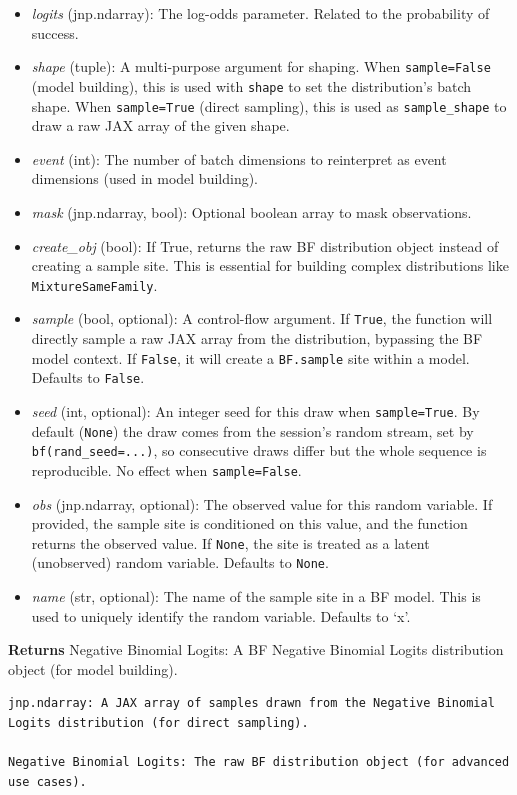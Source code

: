 \documentclass[
  letterpaper,
  DIV=11,
  numbers=noendperiod]{scrartcl}
\begin{document}
\begin{itemize}
\item
  \emph{logits} (jnp.ndarray): The log-odds parameter. Related to the
  probability of success.
\item
  \emph{shape} (tuple): A multi-purpose argument for shaping. When
  \texttt{sample=False} (model building), this is used with
  \texttt{shape} to set the distribution's batch shape. When
  \texttt{sample=True} (direct sampling), this is used as
  \texttt{sample\_shape} to draw a raw JAX array of the given shape.
\item
  \emph{event} (int): The number of batch dimensions to reinterpret as
  event dimensions (used in model building).
\item
  \emph{mask} (jnp.ndarray, bool): Optional boolean array to mask
  observations.
\item
  \emph{create\_obj} (bool): If True, returns the raw BF distribution
  object instead of creating a sample site. This is essential for
  building complex distributions like \texttt{MixtureSameFamily}.
\item
  \emph{sample} (bool, optional): A control-flow argument. If
  \texttt{True}, the function will directly sample a raw JAX array from
  the distribution, bypassing the BF model context. If \texttt{False},
  it will create a \texttt{BF.sample} site within a model. Defaults to
  \texttt{False}.
\item
  \emph{seed} (int, optional): An integer seed for this draw when
  \texttt{sample=True}. By default (\texttt{None}) the draw comes from
  the session's random stream, set by \texttt{bf(rand\_seed=...)}, so
  consecutive draws differ but the whole sequence is reproducible. No
  effect when \texttt{sample=False}.
\item
  \emph{obs} (jnp.ndarray, optional): The observed value for this random
  variable. If provided, the sample site is conditioned on this value,
  and the function returns the observed value. If \texttt{None}, the
  site is treated as a latent (unobserved) random variable. Defaults to
  \texttt{None}.
\item
  \emph{name} (str, optional): The name of the sample site in a BF
  model. This is used to uniquely identify the random variable. Defaults
  to `x'.
\end{itemize}

\textbf{Returns} Negative Binomial Logits: A BF Negative Binomial Logits
distribution object (for model building).

\begin{verbatim}
jnp.ndarray: A JAX array of samples drawn from the Negative Binomial Logits distribution (for direct sampling).

Negative Binomial Logits: The raw BF distribution object (for advanced use cases).
\end{verbatim}
\end{document}
